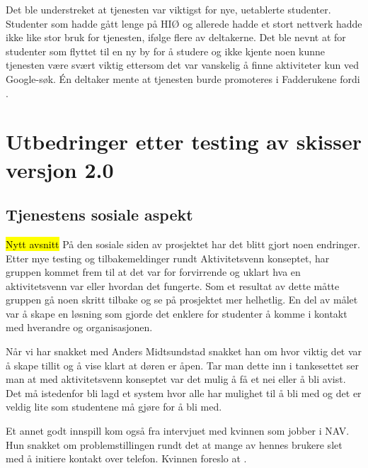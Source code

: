 Det ble understreket at tjenesten var viktigst for nye, uetablerte studenter. Studenter som hadde gått lenge på HIØ og allerede hadde et stort nettverk hadde ikke like stor bruk for tjenesten, ifølge flere av deltakerne. Det ble nevnt at for studenter som flyttet til en ny by for å studere og ikke kjente noen kunne tjenesten være svært viktig ettersom det var vanskelig å finne aktiviteter kun ved Google-søk. Én deltaker mente at tjenesten burde promoteres i Fadderukene fordi . 


\section{Utbedringer etter testing av skisser versjon 2.0}
\label{section:utbedringer-2.0}

\subsection{Tjenestens sosiale aspekt}
\label{section:tjenestens-sosiale-aspekt}
\hl{Nytt avsnitt}
På den sosiale siden av prosjektet har det blitt gjort noen endringer. Etter mye testing og tilbakemeldinger rundt Aktivitetsvenn konseptet, har gruppen kommet frem til at det var for forvirrende og uklart hva en aktivitetsvenn var eller hvordan det fungerte. Som et resultat av dette måtte gruppen gå noen skritt tilbake og se på prosjektet mer helhetlig. En del av målet var å  skape en løsning som gjorde det enklere for studenter å komme i kontakt med hverandre og organisasjonen. 

Når vi har snakket med Anders Midtsundstad snakket han om hvor viktig det var å skape tillit og å vise klart at døren er åpen. Tar man dette inn i tankesettet ser man at med aktivitetsvenn konseptet var det mulig å få et nei eller å bli avist. Det må istedenfor bli lagd et system hvor alle har mulighet til å bli med og det er veldig lite som studentene må gjøre for å bli med.

Et annet godt innspill kom også fra intervjuet med kvinnen som jobber i NAV. Hun snakket om problemstillingen rundt det at mange av hennes brukere slet med å initiere kontakt over telefon. Kvinnen foreslo at  \cite{NAV-INTERVJU:16}.

